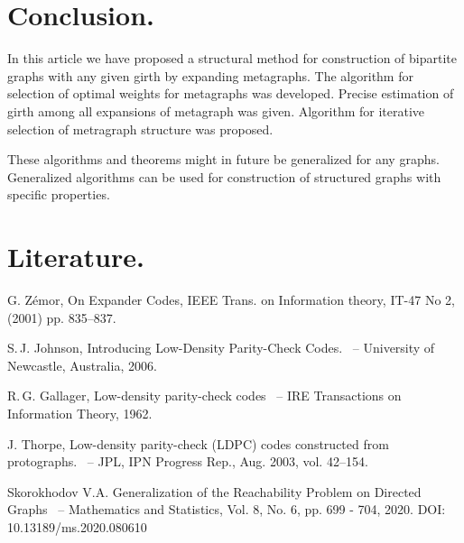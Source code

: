 \documentclass[14pt]{mmcs-article}
\begin{document}
\section{Conclusion.}



In this article we have proposed a structural method for construction of bipartite graphs with any given girth by expanding metagraphs. The algorithm for selection of optimal weights for metagraphs was developed. Precise estimation of girth among all expansions of metagraph was given. Algorithm for iterative selection of metragraph structure was proposed.

These algorithms and theorems might in future be generalized for any graphs. Generalized algorithms can be used for construction of structured graphs with specific properties.

\section{Literature.}


G. Zémor, On Expander Codes, IEEE Trans. on Information theory, IT-47
No 2, (2001) pp. 835–837.
  
S.\,J. Johnson,
Introducing Low-Density Parity-Check Codes.
~-- University of Newcastle, Australia, 2006.

R.\,G. Gallager,
Low-density parity-check codes
~-- IRE Transactions on Information Theory, 1962.

J. Thorpe,
Low-density parity-check (LDPC) codes constructed from protographs.
~-- JPL, IPN Progress Rep., Aug. 2003, vol. 42–154.

Skorokhodov V.A. Generalization of the Reachability Problem on Directed Graphs
~-- Mathematics and Statistics, Vol. 8, No. 6, pp. 699 - 704, 2020. DOI: 10.13189/ms.2020.080610



\end{document}
